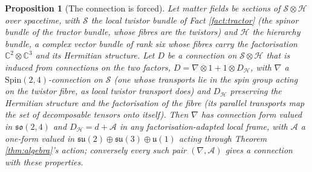\documentclass[11pt]{article}
\newtheorem{proposition}[theorem]{Proposition}
\theoremstyle{definition}
\newcommand{\C}{\mathbb{C}}
\newcommand{\su}{\mathfrak{su}}
\newcommand{\uu}{\mathfrak{u}}
\begin{document}
\begin{proposition}[The connection is forced]\label{prop:connection}
Let matter fields be sections of $\mathcal{S} \otimes \mathcal{H}$ over spacetime, with $\mathcal{S}$ the local twistor bundle of Fact \ref{fact:tractor} (the spinor bundle of the tractor bundle, whose fibres are the twistors) and $\mathcal{H}$ the hierarchy bundle, a complex vector bundle of rank six whose fibres carry the factorisation $\C^{2} \otimes \C^{3}$ and its Hermitian structure. Let $D$ be a connection on $\mathcal{S} \otimes \mathcal{H}$ that is induced from connections on the two factors, $D = \nabla \otimes 1 + 1 \otimes D_{\mathcal{H}}$, with $\nabla$ a $\mathrm{Spin}(2,4)$-connection on $\mathcal{S}$ (one whose transports lie in the spin group acting on the twistor fibre, as local twistor transport does) and $D_{\mathcal{H}}$ preserving the Hermitian structure and the factorisation of the fibre (its parallel transports map the set of decomposable tensors onto itself). Then $\nabla$ has connection form valued in $\mathfrak{so}(2,4)$ and $D_{\mathcal{H}} = d + \mathcal{A}$ in any factorisation-adapted local frame, with $\mathcal{A}$ a one-form valued in $\su(2) \oplus \su(3) \oplus \uu(1)$ acting through Theorem \ref{thm:algebra}'s action; conversely every such pair $(\nabla, \mathcal{A})$ gives a connection with these properties.
\end{proposition}
\end{document}
